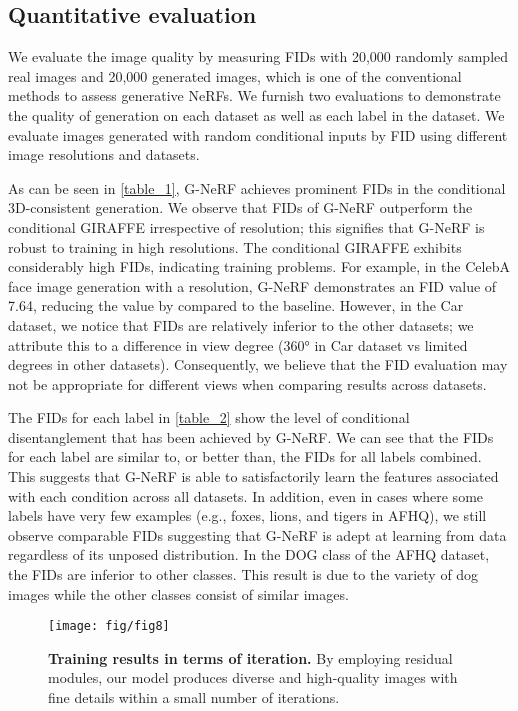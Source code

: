 \documentclass[nohyperref]{article}
\theoremstyle{plain}
\theoremstyle{definition}
\theoremstyle{remark}
\begin{document}
\subsection{Quantitative evaluation}
We evaluate the image quality by measuring FIDs with 20,000 randomly sampled real images and 20,000 generated images, which is one of the conventional methods to assess generative NeRFs. We furnish two evaluations to demonstrate the quality of generation on each dataset as well as each label in the dataset. We evaluate images generated with random conditional inputs by FID using different image resolutions and datasets.


As can be seen in \cref{table_1}, G-NeRF achieves prominent FIDs in the conditional 3D-consistent generation. We observe that FIDs of G-NeRF outperform the conditional GIRAFFE irrespective of resolution; this signifies that G-NeRF is robust to training in high resolutions. The conditional GIRAFFE exhibits considerably high FIDs, indicating training problems. For example, in the CelebA face image generation with a  resolution, G-NeRF demonstrates an FID value of 7.64, reducing the value by  compared to the baseline. However, in the Car dataset, we notice that FIDs are relatively inferior to the other datasets; we attribute this to a difference in view degree (360° in Car dataset vs limited degrees in other datasets). Consequently, we believe that the FID evaluation may not be appropriate for different views when comparing results across datasets.


The FIDs for each label in \cref{table_2} show the level of conditional disentanglement that has been achieved by G-NeRF. We can see that the FIDs for each label are similar to, or better than, the FIDs for all labels combined. This suggests that G-NeRF is able to satisfactorily learn the features associated with each condition across all datasets. In addition, even in cases where some labels have very few examples (e.g., foxes, lions, and tigers in AFHQ), we still observe comparable FIDs suggesting that G-NeRF is adept at learning from data regardless of its unposed distribution. In the DOG class of the AFHQ dataset, the FIDs are inferior to other classes. This result is due to the variety of dog images while the other classes consist of similar images.

\begin{figure}[t]
\begin{center}
\centerline{\texttt{[image: fig/fig8]}}
\caption{\textbf{Training results in terms of iteration.} By employing residual modules, our model produces diverse and high-quality images with fine details within a small number of iterations.}
\label{figure_8}
\end{center}
\vskip -0.2in
\end{figure}
\end{document}
